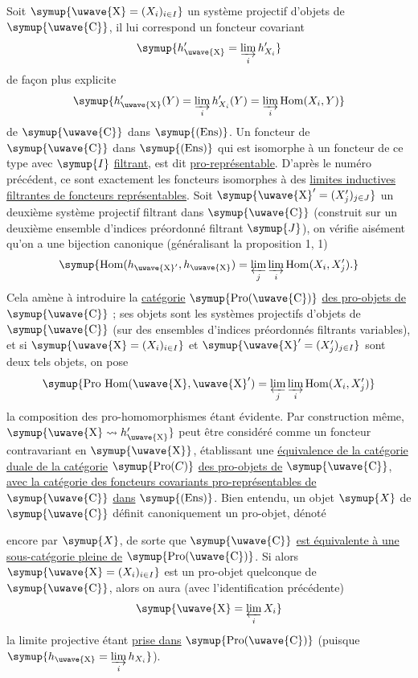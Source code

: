 Soit $\symup{\text{\uwave{X}}=(X_i)_{i\in I}}$ un système projectif d'objets de
$\symup{\text{\uwave{C}}}$, il lui correspond un foncteur covariant
\[
  \symup{h'_{\text{\uwave{X}}}=\varinjlim\limits_i h'_{X_i}}
\]
de façon plus explicite
\[
  \symup{h'_{\text{\uwave{X}}}(Y)=\varinjlim\limits_i h'_{X_i}(Y)
  =\varinjlim\limits_i\operatorname{Hom}(X_i,Y)}
\]
de $\symup{\text{\uwave{C}}}$ dans $\symup{(\operatorname{Ens})}$. Un foncteur de $\symup{\text{\uwave{C}}}$ dans
$\symup{(\operatorname{Ens})}$ qui est isomorphe à un foncteur de ce type avec $\symup{I}$
\uline{filtrant}, est dit \uline{pro-représentable}. D'après le numéro précédent, ce
sont exactement les foncteurs isomorphes à des \uline{limites inductives filtrantes de foncteurs représentables}. Soit
$\symup{\text{\uwave{X}}'=(X'_j)_{j\in J}}$ un deuxième système projectif filtrant dans
$\symup{\text{\uwave{C}}}$ (construit sur un deuxième ensemble d'indices préordonné filtrant
$\symup{J}$), on vérifie aisément qu'on a une bijection canonique (généralisant la
proposition 1, 1)
\[
  \symup{\operatorname{Hom}(h_{\text{\uwave{X}}'},h_{\text{\uwave{X}}})
  =\varprojlim\limits_j\varinjlim\limits_i\operatorname{Hom}(X_i,X'_j).}
\]
Cela amène à introduire la \uline{catégorie} $\symup{\operatorname{Pro}(\text{\uwave{C}})}$ \uline{des pro-objets de} $\symup{\text{\uwave{C}}}$ ; ses objets sont les systèmes projectifs d'objets
de $\symup{\text{\uwave{C}}}$ (sur des ensembles d'indices préordonnés filtrants variables),
et si $\symup{\text{\uwave{X}}=(X_i)_{i\in I}}$ et
$\symup{\text{\uwave{X}}'=(X'_j)_{j\in I}}$ sont deux tels objets, on pose
\[
  \symup{\operatorname{Pro\ Hom}(\text{\uwave{X}},\text{\uwave{X}}')
  =\varprojlim\limits_j\varinjlim\limits_i\operatorname{Hom}(X_i,X'_j)}
\]
la composition des pro-homomorphismes étant évidente. Par construction même,
$\symup{\text{\uwave{X}}\rightsquigarrow h'_{\text{\uwave{X}}}}$ peut être considéré comme un
foncteur contravariant en $\symup{\text{\uwave{X}}}$, établissant une \uline{équivalence de la
catégorie duale de la catégorie} $\symup{\operatorname{Pro}(C)}$ \uline{des
pro-objets de} $\symup{\text{\uwave{C}}}$, \uline{avec la catégorie des foncteurs covariants
pro-représentables de} $\symup{\text{\uwave{C}}}$ \uline{dans} $\symup{(\operatorname{Ens})}$. Bien entendu,
un objet $\symup{X}$ de $\symup{\text{\uwave{C}}}$ définit canoniquement un pro-objet, dénoté

encore par $\symup{X}$, de sorte que $\symup{\text{\uwave{C}}}$ \uline{est équivalente à une sous-catégorie pleine de} $\symup{\operatorname{Pro}(\text{\uwave{C}})}$. Si alors
$\symup{\text{\uwave{X}}=(X_i)_{i\in I}}$ est un pro-objet quelconque de $\symup{\text{\uwave{C}}}$, alors on aura (avec l'identification précédente)
\[
  \symup{\text{\uwave{X}}=\varprojlim\limits_i X_i}
\]
la limite projective étant \uline{prise dans} $\symup{\operatorname{Pro}(\text{\uwave{C}})}$
(puisque $\symup{h_{\text{\uwave{X}}}=\varinjlim\limits_i h_{X_i}}$).

